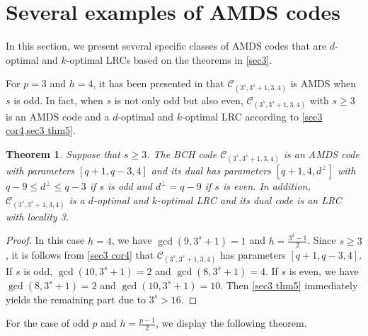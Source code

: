 \documentclass[10pt]{article}%
\newtheorem{theorem}{Theorem}%
\begin{document}
	\section{Several examples of AMDS codes}\label{sec4}
	
	In this section, we present several specific classes of AMDS codes that are $d$-optimal and $k$-optimal LRCs based on the theorems in \cref{sec3}.
	
	For $p=3$ and $h=4$, it has been presented in \cite{Geng2022ClassAlmostMDS} that $\mathcal{C}_{(3^s,3^s+1,3,4)}$ is AMDS when $s$ is odd. In fact, when $s$ is not only odd but also even, $\mathcal{C}_{(3^s,3^s+1,3,4)}$ with $s\ge3$ is an AMDS code and a $d$-optimal and $k$-optimal LRC according to \cref{sec3 cor4,sec3 thm5}.
	\begin{theorem}\label{sec4 thm1}
		Suppose that $s\ge3$. The BCH code $\mathcal{C}_{(3^s,3^s+1,3,4)}$ is an AMDS code with parameters $[q+1,q-3,4]$ and its dual has parameters $[q+1,4,d^\perp]$ with $q-9\le d^\perp\le q-3$ if $s$ is odd and $d^\perp=q-9$ if $s$ is even. In addition, $\mathcal{C}_{(3^s,3^s+1,3,4)}$ is a $d$-optimal and $k$-optimal LRC and its dual code is an LRC with locality 3.
	\end{theorem}
	\begin{proof}
		In this case $h=4$, we have $\gcd(9,3^s+1)=1$ and $h=\frac{3^2-1}{2}$. Since $s\ge3$, it is follows from \cref{sec3 cor4} that $\mathcal{C}_{(3^s,3^s+1,3,4)}$ has parameters $[q+1,q-3,4]$. If $s$ is odd, $\gcd(10,3^s+1)=2$ and $\gcd(8,3^s+1)=4$. If $s$ is even, we have $\gcd(8,3^s+1)=2$ and $\gcd(10,3^s+1)=10$. Then \cref{sec3 thm5} immediately yields the remaining part due to $3^s>16$.
	\end{proof}
	
	For the case of odd $p$ and $h=\frac{p-1}{2}$, we display the following theorem.
	
\end{document}
